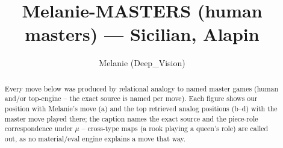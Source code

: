 \documentclass[11pt]{article}
\title{Melanie-MASTERS (human masters) — Sicilian, Alapin}
\author{Melanie (Deep\_Vision)}
\date{}
\begin{document}
\maketitle

\begin{abstract}Every move below was produced by relational analogy to named master games (human and/or top-engine -- the exact source is named per move). Each figure shows our position with Melanie's move (a) and the top retrieved analog positions (b--d) with the master move played there; the caption names the exact source and the piece-role correspondence under $\mu$ -- cross-type maps (a rook playing a queen's role) are called out, as no material/eval engine explains a move that way.\end{abstract}

\begin{figure}[p]\centering
\begin{subfigure}{0.46\textwidth}\centering
\resizebox{\linewidth}{!}{%
\newchessgame
\chessboard[
  setfen={r1bqkb1r/pp2pppp/2np4/3nP3/3P4/5N2/PP3PPP/RNBQKB1R w KQkq - 0 7},
  showmover=false,
  pgfstyle=straightmove, color=movearrow, markmove={e1-e2}
]}
\caption{}
\end{subfigure}\hfill
\begin{subfigure}{0.46\textwidth}\centering
\resizebox{\linewidth}{!}{%
\newchessgame
\chessboard[
  setfen={r1b2rk1/ppq2ppp/2n1pn2/2p5/3P4/P1P1P3/B3NPPP/R1BQK2R w KQ - 4 11},
  showmover=false,
  pgfstyle=straightmove, color=movearrow, markmove={e1-g1}
]}
\caption{}
\end{subfigure}
\\[4pt]
\begin{subfigure}{0.46\textwidth}\centering
\resizebox{\linewidth}{!}{%
\newchessgame
\chessboard[
  setfen={r1b2rk1/ppq2ppp/2n1pn2/2p5/3P4/P1P1P3/B3NPPP/R1BQK2R w KQ - 4 11},
  showmover=false,
  pgfstyle=straightmove, color=movearrow, markmove={e1-g1}
]}
\caption{}
\end{subfigure}\hfill
\begin{subfigure}{0.46\textwidth}\centering
\resizebox{\linewidth}{!}{%
\newchessgame
\chessboard[
  setfen={r1b2rk1/ppq2ppp/2n1pn2/2p5/3P4/P1P1P3/B3NPPP/R1BQK2R w KQ - 4 11},
  showmover=false,
  pgfstyle=straightmove, color=movearrow, markmove={e1-g1}
]}
\caption{}
\end{subfigure}

\end{figure}
\end{document}
